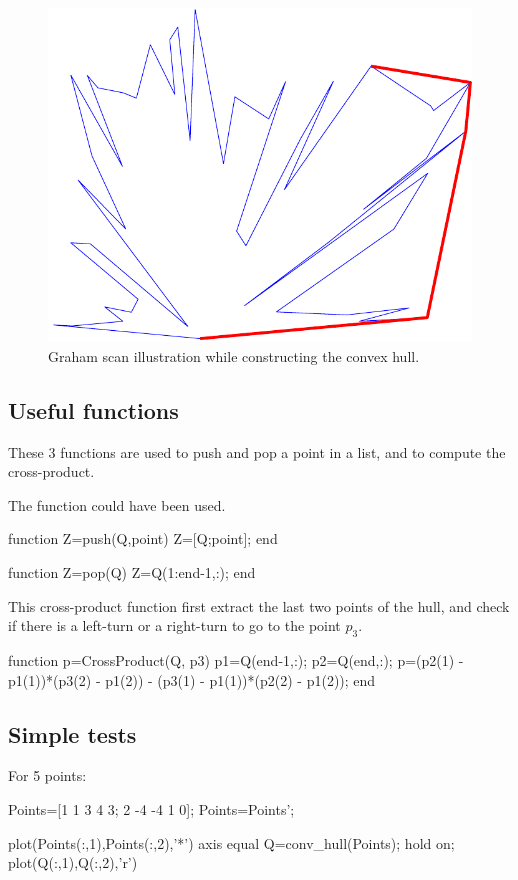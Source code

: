 \begin{figure}[htbp]
 \centering
 \includegraphics[width=.45\linewidth]{chull_50_pause.pdf}
 \caption{Graham scan illustration while constructing the convex hull.}
 \label{fig:matlab:convexhull:pause}
\end{figure}

\subsection{Useful functions}
These 3 functions are used to push and pop a point in a list, and to compute the cross-product. 

\begin{mcomment}
\begin{mremark}
 The \matlabregistered{} function  could have been used.
\end{mremark}
\end{mcomment}


\begin{matlab}    
function Z=push(Q,point)
    Z=[Q;point];
end
\end{matlab}
\begin{matlab}
function Z=pop(Q)
    Z=Q(1:end-1,:);
end
\end{matlab}

This cross-product function first extract the last two points of the hull, and check if there is a left-turn or a right-turn to go to the point $p_3$.
\begin{matlab}
function p=CrossProduct(Q, p3)
    p1=Q(end-1,:);
    p2=Q(end,:);
    p=(p2(1) - p1(1))*(p3(2) - p1(2)) - (p3(1) - p1(1))*(p2(2) - p1(2));
end
\end{matlab}


\subsection{Simple tests}
For 5 points:
\begin{matlab}
Points=[1  1  3 4 3;
        2 -4 -4 1 0];
Points=Points';

plot(Points(:,1),Points(:,2),'*')
axis equal
Q=conv_hull(Points);
hold on;
plot(Q(:,1),Q(:,2),'r')

\end{matlab}

